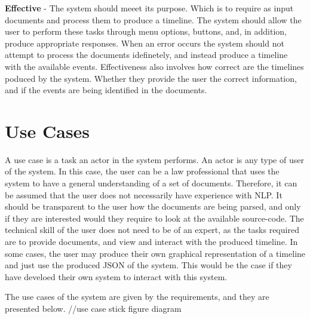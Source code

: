 \par \textbf{Effective} - The system should meeet its purpose. Which is to require as input documents and process them to produce a timeline. The system should allow the user to perform these tasks through menu options, buttons, and, in addition, produce appropriate responses. When an error occurs the system should not attempt to process the documents idefinetely, and instead produce a timeline with the available events. Effectiveness also involves how correct are the timelines poduced by the system. Whether they provide the user the correct information, and if the events are being identified in the documents. 

\section{Use Cases}
\par A use case is a task an actor in the system performs. An actor is any type of user of the system. In this case, the user can be a law professional that uses the system to have a general understanding of a set of documents. Therefore, it can be assumed that the user does not necessarily have experience with NLP. It should be transparent to the user how the documents are being parsed, and only if they are interested would they require to look at the available source-code. The technical skill of the user does not need to be of an expert, as the tasks required are to provide documents, and view and interact with the produced timeline. In some cases, the user may produce their own graphical representation of a timeline and just use the produced JSON of the system. This would be the case if they have develoed their own system to interact with this system.
\par The use cases of the system are given by the requirements, and they are presented below. //use case stick figure diagram
